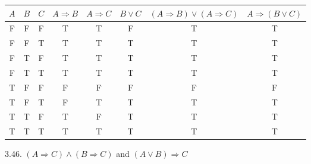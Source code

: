 \documentclass[10pt]{article}
\begin{document}
\begin{enumerate}[label={}]
            \begin{tabular}{ |c|c|c|c|c|c|c|c|  }
                  \hline
                  $A$ & $B$ & $C$ & $A \Rightarrow B$ & $A \Rightarrow C$ & $B \vee C$ & $(A \Rightarrow B) \vee(A \Rightarrow C)$ & $A \Rightarrow(B \vee C)$ \\
                  \hline
                  F   & F   & F   & T                 & T                 & F          & T                                         & T                         \\
                  F   & F   & T   & T                 & T                 & T          & T                                         & T                         \\
                  F   & T   & F   & T                 & T                 & T          & T                                         & T                         \\
                  F   & T   & T   & T                 & T                 & T          & T                                         & T                         \\
                  T   & F   & F   & F                 & F                 & F          & F                                         & F                         \\
                  T   & F   & T   & F                 & T                 & T          & T                                         & T                         \\
                  T   & T   & F   & T                 & F                 & T          & T                                         & T                         \\
                  T   & T   & T   & T                 & T                 & T          & T                                         & T                         \\
                  \hline
            \end{tabular}


            3.46. $(A \Rightarrow C) \wedge(B \Rightarrow C)$ and $(A \vee B) \Rightarrow C$



\end{enumerate}
\end{document}
